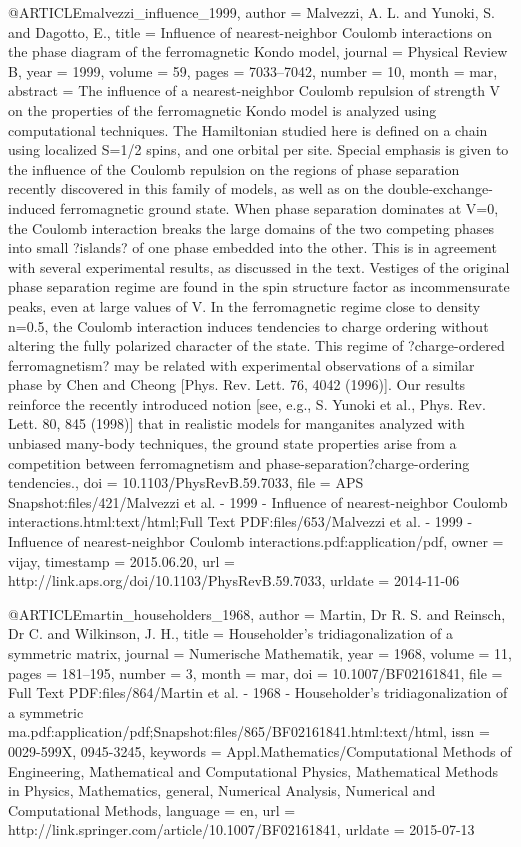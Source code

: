 @ARTICLE{malvezzi_influence_1999,
  author = {Malvezzi, A. L. and Yunoki, S. and Dagotto, E.},
  title = {Influence of nearest-neighbor {Coulomb} interactions on the phase
	diagram of the ferromagnetic {Kondo} model},
  journal = {Physical Review B},
  year = {1999},
  volume = {59},
  pages = {7033--7042},
  number = {10},
  month = mar,
  abstract = {The influence of a nearest-neighbor Coulomb repulsion of strength
	V on the properties of the ferromagnetic Kondo model is analyzed
	using computational techniques. The Hamiltonian studied here is defined
	on a chain using localized S=1/2 spins, and one orbital per site.
	Special emphasis is given to the influence of the Coulomb repulsion
	on the regions of phase separation recently discovered in this family
	of models, as well as on the double-exchange-induced ferromagnetic
	ground state. When phase separation dominates at V=0, the Coulomb
	interaction breaks the large domains of the two competing phases
	into small ?islands? of one phase embedded into the other. This is
	in agreement with several experimental results, as discussed in the
	text. Vestiges of the original phase separation regime are found
	in the spin structure factor as incommensurate peaks, even at large
	values of V. In the ferromagnetic regime close to density n=0.5,
	the Coulomb interaction induces tendencies to charge ordering without
	altering the fully polarized character of the state. This regime
	of ?charge-ordered ferromagnetism? may be related with experimental
	observations of a similar phase by Chen and Cheong [Phys. Rev. Lett.
	76, 4042 (1996)]. Our results reinforce the recently introduced notion
	[see, e.g., S. Yunoki et al., Phys. Rev. Lett. 80, 845 (1998)] that
	in realistic models for manganites analyzed with unbiased many-body
	techniques, the ground state properties arise from a competition
	between ferromagnetism and phase-separation?charge-ordering tendencies.},
  doi = {10.1103/PhysRevB.59.7033},
  file = {APS Snapshot:files/421/Malvezzi et al. - 1999 - Influence of nearest-neighbor Coulomb interactions.html:text/html;Full Text PDF:files/653/Malvezzi et al. - 1999 - Influence of nearest-neighbor Coulomb interactions.pdf:application/pdf},
  owner = {vijay},
  timestamp = {2015.06.20},
  url = {http://link.aps.org/doi/10.1103/PhysRevB.59.7033},
  urldate = {2014-11-06}
}

@ARTICLE{martin_householders_1968,
  author = {Martin, Dr R. S. and Reinsch, Dr C. and Wilkinson, J. H.},
  title = {Householder's tridiagonalization of a symmetric matrix},
  journal = {Numerische Mathematik},
  year = {1968},
  volume = {11},
  pages = {181--195},
  number = {3},
  month = mar,
  doi = {10.1007/BF02161841},
  file = {Full Text PDF:files/864/Martin et al. - 1968 - Householder's tridiagonalization of a symmetric ma.pdf:application/pdf;Snapshot:files/865/BF02161841.html:text/html},
  issn = {0029-599X, 0945-3245},
  keywords = {Appl.Mathematics/Computational Methods of Engineering, Mathematical
	and Computational Physics, Mathematical Methods in Physics, Mathematics,
	general, Numerical Analysis, Numerical and Computational Methods},
  language = {en},
  url = {http://link.springer.com/article/10.1007/BF02161841},
  urldate = {2015-07-13}
}


